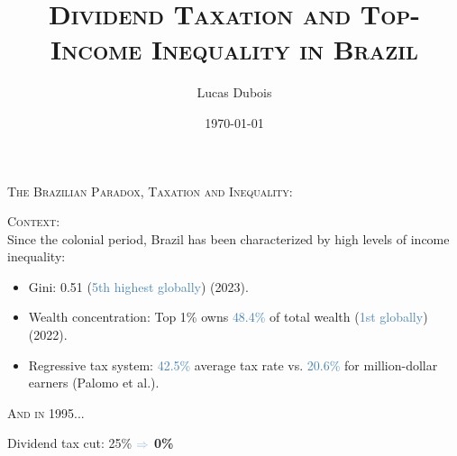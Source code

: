 \documentclass[11pt,aspectratio=169]{beamer}
\title{\textsc{Dividend Taxation and Top-Income Inequality in Brazil}}
\author{Lucas Dubois}
\institute{HEC Liège}
\date{\today}
\begin{document}
\maketitle




\begin{frame}{\textsc{The Brazilian Paradox, Taxation and Inequality:}}

  \textsc{\color{harmonizedblue}Context:} \\
  \medskip
  Since the colonial period, Brazil has been characterized by high levels of income inequality:
  \begin{itemize}
    \item \textcolor{primaryred}{Gini}: 0.51 (\textcolor{steelblue}{5th highest globally}) (2023).
    \item \textcolor{primaryred}{Wealth concentration:} Top 1\% owns \textcolor{steelblue}{48.4\%} of total wealth (\textcolor{steelblue}{1st globally}) (2022).
    \item \textcolor{primaryred}{Regressive tax system:} \textcolor{steelblue}{42.5\%} average tax rate vs. \textcolor{steelblue}{20.6\%} for million-dollar earners (Palomo et al.\cite{zucmanpalomo}).
  \end{itemize}
  \textsc{\color{harmonizedblue}And in 1995...} \\
  \medskip
  \begin{center}
    \large
    Dividend tax cut: \textcolor{primaryred}{25\%} ${\color{steelblue} \Rightarrow}$ \textbf{\color{primaryred}0\%}
  \end{center}

\end{frame}
\end{document}

